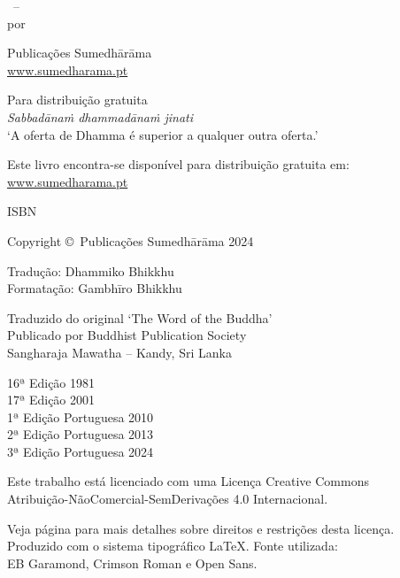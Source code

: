 \cleartoverso
\thispagestyle{empty}

{\copyrightsize
\centering
\setlength{\parindent}{0pt}%
\setlength{\parskip}{0.8\baselineskip}%

\thetitle\ -- \thesubtitle\\
por \theauthor

Publicações Sumedhārāma\\
\href{https://sumedharama.pt}{www.sumedharama.pt}

Para distribuição gratuita\\
\textit{Sabbadānaṁ dhammadānaṁ jinati}\\
‘A oferta de Dhamma é superior a qualquer outra oferta.’

Este livro encontra-se disponível para distribuição gratuita em:\\
\href{https://sumedharama.pt}{www.sumedharama.pt}

ISBN \theISBN

Copyright \copyright\ Publicações Sumedhārāma 2024

Tradução: Dhammiko Bhikkhu\\
Formatação: Gambhīro Bhikkhu

Traduzido do original ‘The Word of the Buddha’\\
Publicado por Buddhist Publication Society\\
Sangharaja Mawatha -- Kandy, Sri Lanka

16ª Edição 1981\\
17ª Edição 2001\\
1ª Edição Portuguesa 2010\\
2ª Edição Portuguesa 2013\\
3ª Edição Portuguesa 2024

\vfill

{\footnotesize

Este trabalho está licenciado com uma Licença Creative Commons\\
Atribuição-NãoComercial-SemDerivações 4.0 Internacional.

Veja página \pageref{copyright-details} para mais detalhes sobre direitos e restrições desta licença.\\
Produzido com o sistema tipográfico \LaTeX. Fonte utilizada:\\
EB Garamond, Crimson Roman e Open Sans.

\theEditionInfo

}}
